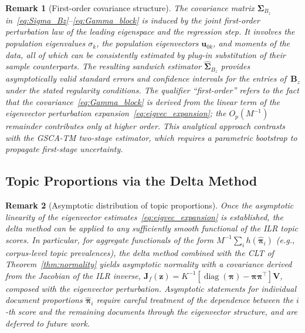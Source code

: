 \documentclass{article}
\newtheorem{remark}{Remark}
\DeclareMathOperator{\diag}{diag}
\begin{document}
\begin{remark}[First-order covariance structure]
\label{rem:no_bootstrap}
The covariance matrix $\boldsymbol{\Sigma}_{B_z}$
in~\eqref{eq:Sigma_Bz}--\eqref{eq:Gamma_block} is induced by the
joint first-order perturbation law of the leading eigenspace and
the regression step. It involves the population eigenvalues
$\sigma_k$, the population eigenvectors $\mathbf{u}_{0k}$, and
moments of the data, all of which can be consistently estimated by
plug-in substitution of their sample counterparts.
The resulting sandwich estimator
$\hat{\boldsymbol{\Sigma}}_{B_z}$ provides asymptotically valid
standard errors and confidence intervals for the entries
of~$\mathbf{B}_z$ under the stated regularity conditions.
The qualifier ``first-order'' refers to the fact that the
covariance~\eqref{eq:Gamma_block} is derived from the linear term
of the eigenvector perturbation expansion~\eqref{eq:eigvec_expansion};
the $O_p(M^{-1})$ remainder contributes only at higher order.
This analytical approach contrasts with the GSCA-TM two-stage
estimator, which requires a parametric bootstrap to propagate
first-stage uncertainty.
\end{remark}


\subsection{Topic Proportions via the Delta Method}
\label{subsec:delta_method}

\begin{remark}[Asymptotic distribution of topic proportions]
\label{rem:pi_delta_method}
Once the asymptotic linearity of the eigenvector
estimates~\eqref{eq:eigvec_expansion} is established, the delta method
can be applied to any sufficiently smooth functional of the ILR topic
scores. In particular, for \emph{aggregate} functionals of the form
$M^{-1}\sum_i h(\hat{\boldsymbol{\pi}}_i)$ (e.g., corpus-level topic
prevalences), the delta method combined with the CLT
of Theorem~\ref{thm:normality} yields asymptotic normality with a
covariance derived from the Jacobian of the ILR inverse,
$\mathbf{J}_f(\mathbf{z}) = K^{-1}[\diag(\boldsymbol{\pi})
- \boldsymbol{\pi}\boldsymbol{\pi}^{\!\top}]\mathbf{V}$, composed with
the eigenvector perturbation. Asymptotic statements for \emph{individual}
document proportions $\hat{\boldsymbol{\pi}}_i$ require careful treatment
of the dependence between the $i$-th score and the remaining documents
through the eigenvector structure, and are deferred to future work.
\end{remark}
\end{document}
